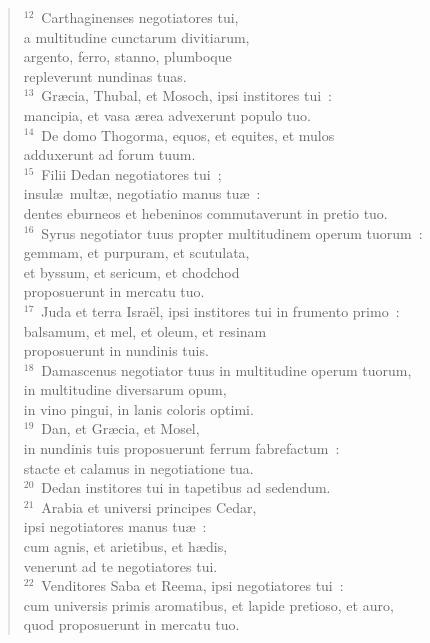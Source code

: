 \begin{verse}
${}^{12}$~Carthaginenses negotiatores tui,\\ a multitudine cunctarum divitiarum,\\ argento, ferro, stanno, plumboque\\ repleverunt nundinas tuas.\\
${}^{13}$~Gr\ae cia, Thubal, et Mosoch, ipsi institores tui~:\\ mancipia, et vasa \ae rea advexerunt populo tuo.\\
${}^{14}$~De domo Thogorma, equos, et equites, et mulos\\ adduxerunt ad forum tuum.\\
${}^{15}$~Filii Dedan negotiatores tui~;\\ insul\ae\ mult\ae , negotiatio manus tu\ae~:\\ dentes eburneos et hebeninos commutaverunt in pretio tuo.\\
${}^{16}$~Syrus negotiator tuus propter multitudinem operum tuorum~:\\ gemmam, et purpuram, et scutulata,\\ et byssum, et sericum, et chodchod\\ proposuerunt in mercatu tuo.\\
${}^{17}$~Juda et terra Isra\"el, ipsi institores tui in frumento primo~:\\ balsamum, et mel, et oleum, et resinam\\ proposuerunt in nundinis tuis.\\
${}^{18}$~Damascenus negotiator tuus in multitudine operum tuorum,\\ in multitudine diversarum opum,\\ in vino pingui, in lanis coloris optimi.\\
${}^{19}$~Dan, et Gr\ae cia, et Mosel,\\ in nundinis tuis proposuerunt ferrum fabrefactum~:\\ stacte et calamus in negotiatione tua.\\
${}^{20}$~Dedan institores tui in tapetibus ad sedendum.\\
${}^{21}$~Arabia et universi principes Cedar,\\ ipsi negotiatores manus tu\ae~:\\ cum agnis, et arietibus, et h\ae dis,\\ venerunt ad te negotiatores tui.\\
${}^{22}$~Venditores Saba et Reema, ipsi negotiatores tui~:\\ cum universis primis aromatibus, et lapide pretioso, et auro,\\ quod proposuerunt in mercatu tuo.\\

\end{verse}

